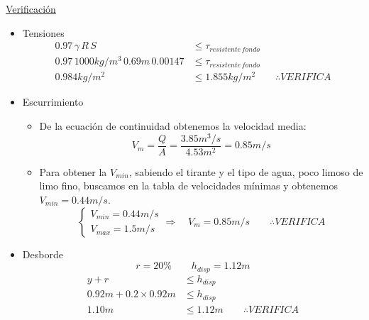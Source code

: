 \underline{Verificación}

\begin{itemize}
 \item Tensiones
    \begin{align*}
    0.97 \, \gamma \, R \, S &\leq \tau_{resistente\,fondo} \\
    0.97 \, 1000 kg/m^3 \, 0.69 m \, 0.00147 &\leq \tau_{resistente\,fondo} \\
    0.984 kg/m^2 &\leq 1.855 kg/m^2
    \qquad
    \therefore VERIFICA 
    \end{align*}

 \item Escurrimiento
    \begin{itemize}
    \item De la ecuación de continuidad obtenemos la velocidad media:
	\begin{equation*}
	V_{m} = \dfrac{Q}{A} = \dfrac{3.85 m^3/s}{4.53 m^2} = 0.85 m/s
	\end{equation*}
    \item Para obtener la $V_{min}$, sabiendo el tirante y el tipo de agua, poco limoso de limo fino, buscamos en
    la tabla de velocidades mínimas y obtenemos $V_{min} = 0.44 m/s$.
	\begin{equation*}
	  \begin{cases}
	  V_{min} = 0.44 m/s \\
	  V_{max} = 1.5 m/s
	  \end{cases}
	  \Longrightarrow \quad
	  V_{m} = 0.85 m/s
	  \qquad
	  \therefore VERIFICA
	\end{equation*}
    \end{itemize}
 
 \item{Desborde}
    \begin{equation*}
    r = 20\%
    \qquad
    h_{disp} = 1.12 m
    \end{equation*}
    \begin{align*}
    y + r &\leq h_{disp} \\
    0.92 m + 0.2 \times 0.92 m &\leq h_{disp} \\
    1.10 m &\leq 1.12 m
    \qquad
    \therefore VERIFICA
    \end{align*}
\end{itemize}
